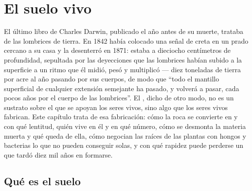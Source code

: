 \chapter{El suelo vivo}\label{ch:b2:living-soil}

El último libro de Charles Darwin, publicado el año antes de su muerte,
trataba de las lombrices de tierra. En 1842 había colocado una señal de
creta en un prado cercano a su casa y la desenterró en 1871: estaba a
dieciocho centímetros de profundidad, sepultada por las deyecciones que
las lombrices habían subido a la superficie a un ritmo que él midió, pesó
y multiplicó --- diez toneladas de tierra por acre al año pasando por sus
cuerpos, de modo que ``todo el mantillo superficial de cualquier extensión
semejante ha pasado, y volverá a pasar, cada pocos años por el cuerpo de
las lombrices''. El , dicho de otro modo, no es un sustrato sobre el
que se apoyan los seres vivos, sino algo que los seres vivos fabrican.
Este capítulo trata de esa fabricación: cómo la roca se convierte en 
y con qué lentitud, quién vive en él y en qué número, cómo se desmonta la
materia muerta y qué queda de ella, cómo negocian las raíces de las
plantas con hongos y bacterias lo que no pueden conseguir solas, y con qué
rapidez puede perderse un  que tardó diez mil años en formarse.

\section{Qué es el suelo}

